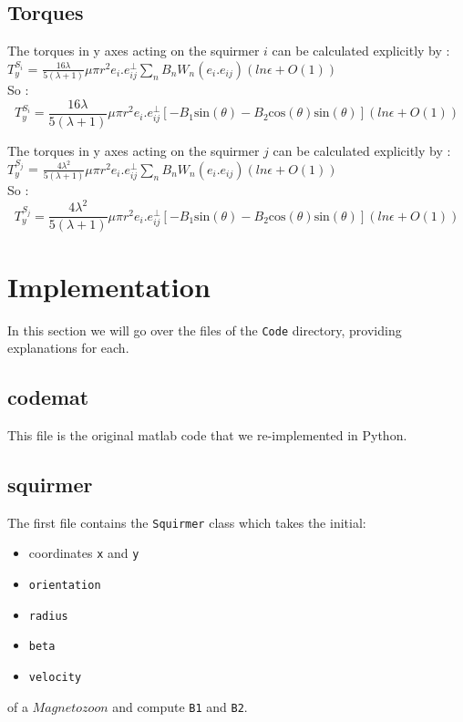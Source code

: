 \documentclass{article}
\begin{document}
\subsection{Torques}
The torques in y axes acting on the squirmer $i$ can be calculated explicitly by : \\
$T_y^{S_i}$ = $\frac{16 \lambda}{5(\lambda +1)} \mu \pi r^2 e_i.e^{\perp}_{ij}\sum_{n} B_n W_n(e_i.e_{ij}) (ln \epsilon + O(1))$
\\ So :
\begin{equation*}
    \boxed{T_y^{S_i} = \frac{16 \lambda}{5(\lambda +1)} \mu \pi r^2 e_i.e^{\perp}_{ij}\left[-B_1\mathrm{sin}(\theta) -B_2\mathrm{cos}(\theta)\mathrm{sin}(\theta) \right] (ln \epsilon + O(1))}
\end{equation*}

The torques in y axes acting on the squirmer $j$ can be calculated explicitly by : \\
$T_y^{S_j}$ = $\frac{4 \lambda^2}{5(\lambda +1)} \mu \pi r^2 e_i.e^{\perp}_{ij}\sum_{n} B_n W_n(e_i.e_{ij}) (ln \epsilon + O(1))$
\\ So :
\begin{equation*}
    \boxed{T_y^{S_j} = \frac{4 \lambda^2}{5(\lambda +1)} \mu \pi r^2 e_i.e^{\perp}_{ij}\left[-B_1\mathrm{sin}(\theta) -B_2\mathrm{cos}(\theta)\mathrm{sin}(\theta) \right] (ln \epsilon + O(1))}
\end{equation*}

\newpage
\section{Implementation}
In this section we will go over the files of the \texttt{Code} directory, providing explanations for each. 

\subsection*{codemat}
This file is the original matlab code that we re-implemented in Python.

\subsection*{squirmer}
The first file contains the \texttt{Squirmer} class which takes the initial: 
\begin{itemize}
   \item coordinates \texttt{x} and \texttt{y}
   \item \texttt{orientation}
   \item \texttt{radius}
   \item \texttt{beta}
   \item \texttt{velocity}
\end{itemize}
of a $Magnetozoon$ and compute \texttt{B1} and \texttt{B2}.
\end{document}
